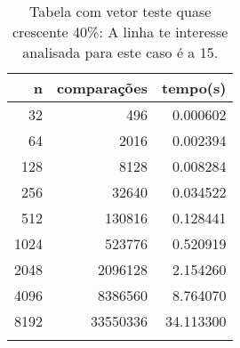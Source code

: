 \begin{table}[ht]
\centering
\begin{tabular}{rrr} \toprule
        n &    comparações &       tempo(s) \\ \midrule
      32  &            496 &      0.000602 \\
      64  &           2016 &      0.002394 \\
     128  &           8128 &      0.008284 \\
     256  &          32640 &      0.034522 \\
     512  &         130816 &      0.128441 \\
    1024  &         523776 &      0.520919 \\
    2048  &        2096128 &      2.154260 \\
    4096  &        8386560 &      8.764070 \\
    8192  &       33550336 &     34.113300 \\
\bottomrule\addlinespace
\end{tabular}
\caption{Tabela com vetor teste quase crescente 40\%: A linha te interesse analisada para este caso é a 15.}
\label{tab:selectionsortQuaseCresc40}
\end{table}
